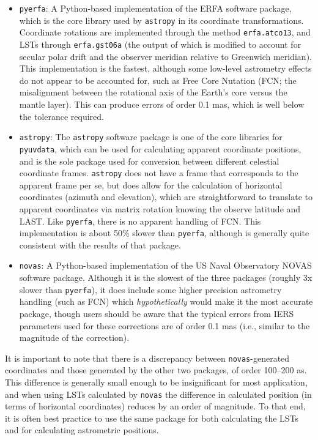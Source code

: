 \documentclass[11pt, oneside]{article}
\begin{document}
\begin{itemize}
\item{\texttt{pyerfa}}: A Python-based implementation of the ERFA software package, which is the core library used by \texttt{astropy} in its coordinate transformations. Coordinate rotations are implemented through the method \texttt{erfa.atco13}, and LSTs through \texttt{erfa.gst06a} (the output of which is modified to account for secular polar drift and the observer meridian relative to Greenwich meridian). This implementation is the fastest, although some low-level astrometry effects do not appear to be accounted for, such as Free Core Nutation (FCN; the misalignment between the rotational axis of the Earth's core versus the mantle layer). This can produce errors of order 0.1 mas, which is well below the tolerance required.

\item{\texttt{astropy}}: The \texttt{astropy} software package is one of the core libraries for \texttt{pyuvdata}, which can be used for calculating apparent coordinate positions, and is the sole package used for conversion between different celestial coordinate frames. \texttt{astropy} does not have a frame that corresponds to the apparent frame per se, but does allow for the calculation of horizontal coordinates (azimuth and elevation), which are straightforward to translate to apparent coordinates via matrix rotation knowing the observe latitude and LAST. Like \texttt{pyerfa}, there is no apparent handling of FCN. This implementation is about 50\% slower than \texttt{pyerfa}, although is generally quite consistent with the results of that package.

\item{\texttt{novas}}: A Python-based implementation of the US Naval Observatory NOVAS software package. Although it is the slowest of the three packages (roughly 3x slower than \texttt{pyerfa}), it does include some higher precision astrometry handling (such as FCN) which \textit{hypothetically} would make it the most accurate package, though users should be aware that the typical errors from IERS parameters used for these corrections are of order 0.1 mas (i.e., similar to the magnitude of the correction).
\end{itemize}

It is important to note that there is a discrepancy between \texttt{novas}-generated coordinates and those generated by the other two packages, of order 100--200 {\textmu}as. This difference is generally small enough to be insignificant for most application, and when using LSTs calculated by \texttt{novas} the difference in calculated position (in terms of horizontal coordinates) reduces by an order of magnitude. To that end, it is often best practice to use the same package for both calculating the LSTs and for calculating astrometric positions.
\end{document}

